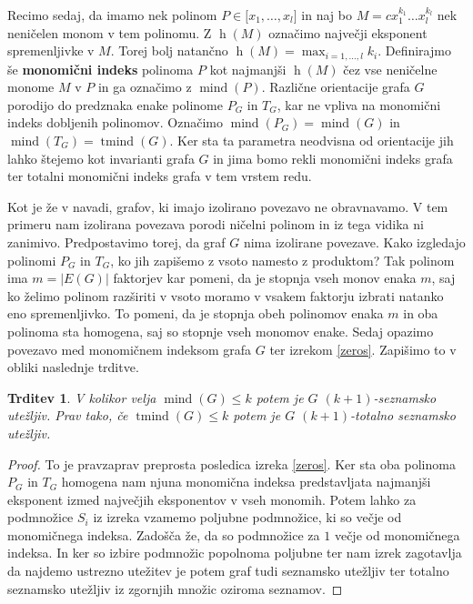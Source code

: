 \documentclass[12pt,a4paper,twoside]{article}
\theoremstyle{definition} %
\theoremstyle{plain} %
\newtheorem{trditev}[definicija]{Trditev}
\numberwithin{equation}{section}  %
\DeclareMathOperator{\mind}{mind}
\DeclareMathOperator{\tmind}{tmind}
\DeclareMathOperator{\h}{h}
\begin{document}
Recimo sedaj, da imamo nek polinom $ P \in \mathbb[x_1, \ldots, x_l]$ in naj bo $M = cx_1^{k_1} \ldots x_l^{k_l}$ nek neničelen monom v tem polinomu. Z $\h(M)$ označimo največji eksponent spremenljivke v $M$. Torej bolj natančno $\h(M) = \max_{i = 1, \ldots, l} k_i$. Definirajmo še \textbf{monomični indeks} polinoma $P$ kot najmanjši $\h(M)$ čez vse neničelne monome $M$ v $P$ in ga označimo z \textbf{$\mind(P)$}. Različne orientacije grafa $G$ porodijo do predznaka enake polinome $P_G$ in $T_G$, kar ne vpliva na monomični indeks dobljenih polinomov. Označimo $\mind(P_G) = \mind(G)$ in $\mind(T_G) = \tmind(G)$. Ker sta ta parametra neodvisna od orientacije jih lahko štejemo kot invarianti grafa $G$ in jima bomo rekli monomični indeks grafa ter totalni monomični indeks grafa v tem vrstem redu. 

Kot je že v navadi, grafov, ki imajo izolirano povezavo ne obravnavamo. V tem primeru nam izolirana povezava porodi ničelni polinom in iz tega vidika ni zanimivo. Predpostavimo torej, da graf $G$ nima izolirane povezave. Kako izgledajo polinomi $P_G$ in $T_G$, ko jih zapišemo z vsoto namesto z produktom? Tak polinom ima $m = |E(G)|$ faktorjev kar pomeni, da je stopnja vseh monov enaka $m$, saj ko želimo polinom razširiti v vsoto moramo v vsakem faktorju izbrati natanko eno spremenljivko. To pomeni, da je stopnja obeh polinomov enaka $m$ in oba polinoma sta homogena, saj so stopnje vseh monomov enake. Sedaj opazimo povezavo med monomičnem indeksom grafa $G$ ter izrekom \ref{zeros}. Zapišimo to v obliki naslednje trditve.
\begin{trditev}
V kolikor velja $\mind(G) \le k$ potem je $G$ $(k+1)$-seznamsko utežljiv. Prav tako, če $\tmind(G) \le k$ potem je $G$ $(k+1)$-totalno seznamsko utežljiv.
\end{trditev}

\begin{proof}
To je pravzaprav preprosta posledica izreka \ref{zeros}. Ker sta oba polinoma $P_G$ in $T_G$ homogena nam njuna monomična indeksa predstavljata najmanjši eksponent izmed največjih eksponentov v vseh monomih. Potem lahko za podmnožice $S_i$ iz izreka vzamemo poljubne podmnožice, ki so večje od monomičnega indeksa. Zadošča že, da so podmnožice za $1$ večje od monomičnega indeksa. In ker so izbire podmnožic popolnoma poljubne ter nam izrek zagotavlja da najdemo ustrezno utežitev je potem graf tudi seznamsko utežljiv ter totalno seznamsko utežljiv iz zgornjih množic oziroma seznamov.
\end{proof}
\end{document}
